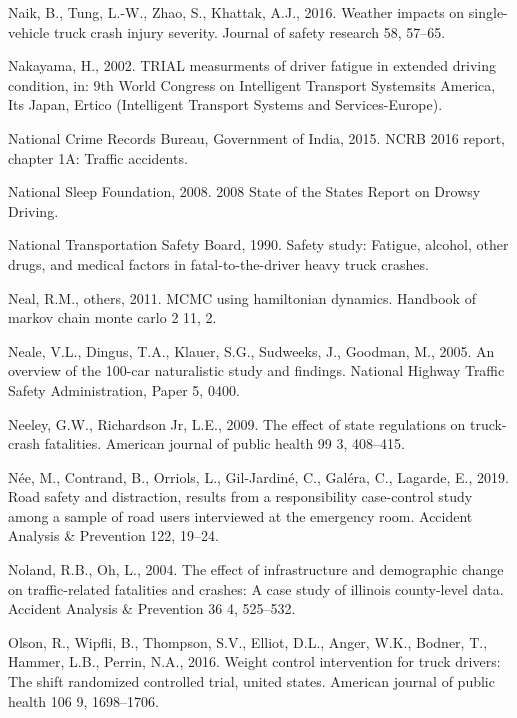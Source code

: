 \documentclass[12pt]{book}
\numberwithin{equation}{chapter}
\begin{document}
\leavevmode\hypertarget{ref-naik2016weather}{}%
Naik, B., Tung, L.-W., Zhao, S., Khattak, A.J., 2016. Weather impacts on single-vehicle truck crash injury severity. Journal of safety research 58, 57--65.

\leavevmode\hypertarget{ref-nakayama2002trial}{}%
Nakayama, H., 2002. TRIAL measurments of driver fatigue in extended driving condition, in: 9th World Congress on Intelligent Transport Systemsits America, Its Japan, Ertico (Intelligent Transport Systems and Services-Europe).

\leavevmode\hypertarget{ref-india2015}{}%
National Crime Records Bureau, Government of India, 2015. NCRB 2016 report, chapter 1A: Traffic accidents.

\leavevmode\hypertarget{ref-nsleepf}{}%
National Sleep Foundation, 2008. 2008 State of the States Report on Drowsy Driving.

\leavevmode\hypertarget{ref-ntsb1990}{}%
National Transportation Safety Board, 1990. Safety study: Fatigue, alcohol, other drugs, and medical factors in fatal-to-the-driver heavy truck crashes.

\leavevmode\hypertarget{ref-neal2011mcmc}{}%
Neal, R.M., others, 2011. MCMC using hamiltonian dynamics. Handbook of markov chain monte carlo 2 11, 2.

\leavevmode\hypertarget{ref-neale2005overview}{}%
Neale, V.L., Dingus, T.A., Klauer, S.G., Sudweeks, J., Goodman, M., 2005. An overview of the 100-car naturalistic study and findings. National Highway Traffic Safety Administration, Paper 5, 0400.

\leavevmode\hypertarget{ref-neeley2009effect}{}%
Neeley, G.W., Richardson Jr, L.E., 2009. The effect of state regulations on truck-crash fatalities. American journal of public health 99 3, 408--415.

\leavevmode\hypertarget{ref-nee2019road}{}%
Née, M., Contrand, B., Orriols, L., Gil-Jardiné, C., Galéra, C., Lagarde, E., 2019. Road safety and distraction, results from a responsibility case-control study among a sample of road users interviewed at the emergency room. Accident Analysis \& Prevention 122, 19--24.

\leavevmode\hypertarget{ref-noland2004effect}{}%
Noland, R.B., Oh, L., 2004. The effect of infrastructure and demographic change on traffic-related fatalities and crashes: A case study of illinois county-level data. Accident Analysis \& Prevention 36 4, 525--532.

\leavevmode\hypertarget{ref-olson2016weight}{}%
Olson, R., Wipfli, B., Thompson, S.V., Elliot, D.L., Anger, W.K., Bodner, T., Hammer, L.B., Perrin, N.A., 2016. Weight control intervention for truck drivers: The shift randomized controlled trial, united states. American journal of public health 106 9, 1698--1706.
\end{document}
